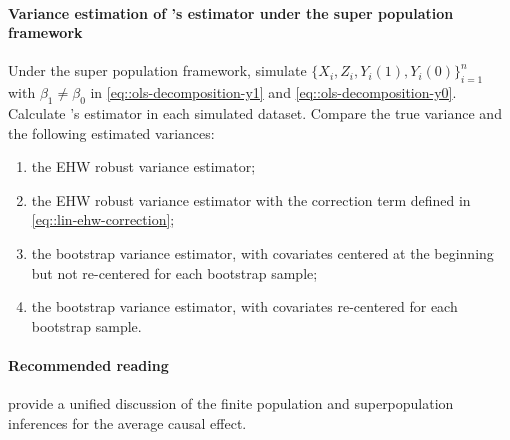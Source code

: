  
\paragraph{Variance estimation of \citet{lin2013}'s estimator under the super population framework}\label{hw::variance-bootstrap-superpopulation}
 
Under the super population framework, simulate $\{  X_i, Z_i, Y_i(1), Y_i(0) \}_{i=1}^n$ with $\beta_1 \neq \beta_0$ in \eqref{eq::ols-decomposition-y1} and \eqref{eq::ols-decomposition-y0}. Calculate \citet{lin2013}'s estimator in each simulated dataset. 
Compare the true variance and the following estimated variances:
\begin{enumerate}
\item
the EHW robust variance estimator;
\item
the EHW robust variance estimator with the correction term defined in \eqref{eq::lin-ehw-correction};
\item
the bootstrap variance estimator, with covariates centered at the beginning but not re-centered for each bootstrap sample;
\item
the bootstrap variance estimator, with covariates re-centered for each bootstrap sample.
\end{enumerate}

  
 


\paragraph{Recommended reading}


\citet{ding2017bridging} provide a unified discussion of the finite population and superpopulation inferences for the average causal effect. 

